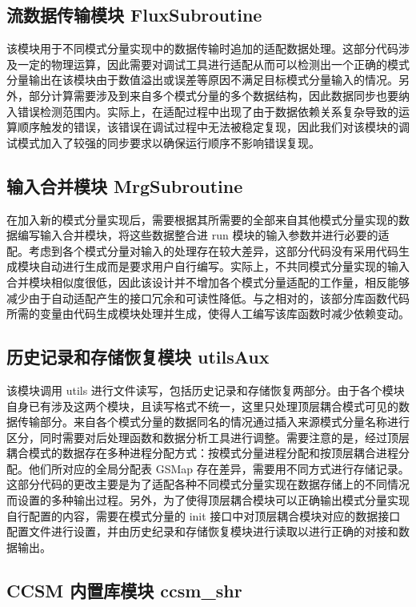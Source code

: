 \subsection{流数据传输模块 FluxSubroutine}

该模块用于不同模式分量实现中的数据传输时追加的适配数据处理。这部分代码涉及一定的物理运算，因此需要对调试工具进行适配从而可以检测出一个正确的模式分量输出在该模块由于数值溢出或误差等原因不满足目标模式分量输入的情况。另外，部分计算需要涉及到来自多个模式分量的多个数据结构，因此数据同步也要纳入错误检测范围内。实际上，在适配过程中出现了由于数据依赖关系复杂导致的运算顺序触发的错误，该错误在调试过程中无法被稳定复现，因此我们对该模块的调试模式加入了较强的同步要求以确保运行顺序不影响错误复现。

\subsection{输入合并模块 MrgSubroutine}

在加入新的模式分量实现后，需要根据其所需要的全部来自其他模式分量实现的数据编写输入合并模块，将这些数据整合进 run 模块的输入参数并进行必要的适配。考虑到各个模式分量对输入的处理存在较大差异，这部分代码没有采用代码生成模块自动进行生成而是要求用户自行编写。实际上，不共同模式分量实现的输入合并模块相似度很低，因此该设计并不增加各个模式分量适配的工作量，相反能够减少由于自动适配产生的接口冗余和可读性降低。与之相对的，该部分库函数代码所需的变量由代码生成模块处理并生成，使得人工编写该库函数时减少依赖变动。

\subsection{历史记录和存储恢复模块 utilsAux}

该模块调用 utils 进行文件读写，包括历史记录和存储恢复两部分。由于各个模块自身已有涉及这两个模块，且读写格式不统一，这里只处理顶层耦合模式可见的数据传输部分。来自各个模式分量的数据同名的情况通过插入来源模式分量名称进行区分，同时需要对后处理函数和数据分析工具进行调整。需要注意的是，经过顶层耦合模式的数据存在多种进程分配方式：按模式分量进程分配和按顶层耦合进程分配。他们所对应的全局分配表 GSMap 存在差异，需要用不同方式进行存储记录。这部分代码的更改主要是为了适配各种不同模式分量实现在数据存储上的不同情况而设置的多种输出过程。另外，为了使得顶层耦合模块可以正确输出模式分量实现自行配置的内容，需要在模式分量的 init 接口中对顶层耦合模块对应的数据接口配置文件进行设置，并由历史纪录和存储恢复模块进行读取以进行正确的对接和数据输出。

\subsection{CCSM 内置库模块 ccsm\_shr}

